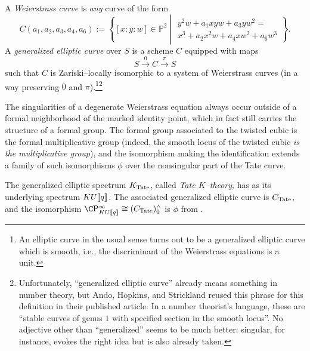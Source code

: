 \begin{definition}
A \textit{Weierstrass curve} is \emph{any} curve of the form \[C(a_1, a_2, a_3, a_4, a_6) := \left\{ [x : y : w] \in \mathbb P^2 \middle| \begin{array}{c} y^2 w + a_1 xyw + a_3 yw^2 = \\ x^3 + a_2 x^2 w + a_4 x w^2 + a_6 w^3 \end{array} \right\}.\]  A \textit{generalized elliptic curve} over $S$ is a scheme $C$ equipped with maps \[S \xrightarrow{0} C \xrightarrow{\pi} S\] such that $C$ is Zariski--locally isomorphic to a system of Weierstrass curves (in a way preserving $0$ and $\pi$).\footnote{An elliptic curve in the usual sense turns out to be a generalized elliptic curve which is smooth, i.e., the discriminant of the Weierstrass equations is a unit.}\footnote{Unfortunately, ``generalized elliptic curve'' already means something in number theory, but Ando, Hopkins, and Strickland reused this phrase for this definition in their published article.  In a number theorist's language, these are ``stable curves of genus $1$ with specified section in the smooth locus''.  No adjective other than ``generalized'' seems to be much better: singular, for instance, evokes the right idea but is also already taken.}
\end{definition}

\begin{remark}\label{TwistedCubicGivesGm}
The singularities of a degenerate Weierstrass equation always occur outside of a formal neighborhood of the marked identity point, which in fact still carries the structure of a formal group.  The formal group associated to the twisted cubic is the formal multiplicative group (indeed, the smooth locus of the twisted cubic \emph{is the multiplicative group}), and the isomorphism making the identification extends a family of such isomorphisms $\phi$ over the nonsingular part of the Tate curve.
\end{remark}

\begin{definition}\label{TateKTheoryDefn}
The generalized elliptic spectrum $K_{\mathrm{Tate}}$, called \textit{Tate $K$--theory}, has as its underlying spectrum $KU\llbracket{q}\rrbracket$.  The associated generalized elliptic curve is $C_{\mathrm{Tate}}$, and the isomorphism $\CP^\infty_{KU\ps{q}} \cong (C_{\Tate})^\wedge_0$ is $\phi$ from .
\end{definition}

